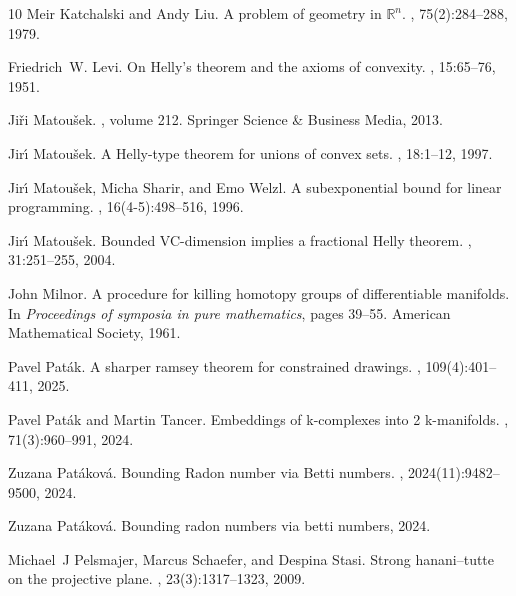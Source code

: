\documentclass[11pt]{article}
\begin{document}
\begin{thebibliography}{10}
Meir Katchalski and Andy Liu.
\newblock A problem of geometry in {$\mathbb{R}^n$}.
,
  75(2):284--288, 1979.

Friedrich~W. Levi.
\newblock On {H}elly's theorem and the axioms of convexity.
, 15:65--76, 1951.

Ji{\v r}i Matou{\v s}ek.
, volume 212.
\newblock Springer Science \& Business Media, 2013.

Jir{\'\i} Matou\v{s}ek.
\newblock A {H}elly-type theorem for unions of convex sets.
, 18:1--12, 1997.

Jir{\'\i} Matou\v{s}ek, Micha Sharir, and Emo Welzl.
\newblock A subexponential bound for linear programming.
, 16(4-5):498--516, 1996.

Jir{\'\i} Matou{š}ek.
\newblock Bounded {VC}-dimension implies a fractional {H}elly theorem.
, 31:251--255, 2004.

John Milnor.
\newblock A procedure for killing homotopy groups of differentiable manifolds.
\newblock In {\em Proceedings of symposia in pure mathematics}, pages 39--55.
  American Mathematical Society, 1961.

Pavel Pat{\'a}k.
\newblock A sharper ramsey theorem for constrained drawings.
, 109(4):401--411, 2025.

Pavel Pat{\'a}k and Martin Tancer.
\newblock Embeddings of k-complexes into 2 k-manifolds.
, 71(3):960--991, 2024.

Zuzana Patáková.
\newblock Bounding {R}adon number via {B}etti numbers.
,
  2024(11):9482--9500, 2024.

Zuzana Patáková.
\newblock Bounding radon numbers via betti numbers, 2024.

Michael~J Pelsmajer, Marcus Schaefer, and Despina Stasi.
\newblock Strong hanani--tutte on the projective plane.
, 23(3):1317--1323, 2009.


\end{thebibliography}
\end{document}
